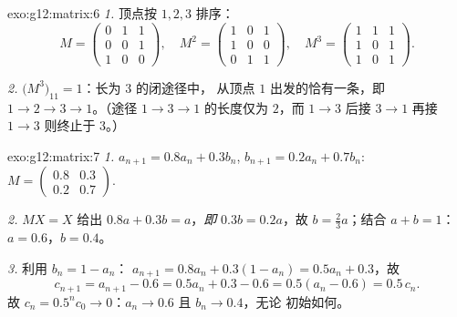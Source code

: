 \begin{solution}{exo:g12:matrix:6}
\emph{1.} 顶点按 $1, 2, 3$ 排序：
\[
M = \begin{pmatrix} 0&1&1\\ 0&0&1\\ 1&0&0\end{pmatrix}, \quad
M^2 = \begin{pmatrix} 1&0&1\\ 1&0&0\\ 0&1&1\end{pmatrix}, \quad
M^3 = \begin{pmatrix} 1&1&1\\ 1&0&1\\ 1&0&1 \end{pmatrix}.
\]

\emph{2.} $\bigl(M^3\bigr)_{11} = 1$：长为 $3$ 的闭途径中，
从顶点 $1$ 出发的恰有一条，即 $1 \to 2 \to 3 \to 1$。（途径
$1 \to 3 \to 1$ 的长度仅为 $2$，而 $1 \to 3$ 后接 $3\to1$ 再接
$1\to3$ 则终止于 $3$。）
\end{solution}

\begin{solution}{exo:g12:matrix:7}
\emph{1.} $a_{n+1} = 0.8a_n + 0.3b_n$, $b_{n+1} = 0.2a_n + 0.7b_n$:
$M = \begin{pmatrix} 0.8 & 0.3\\ 0.2 & 0.7\end{pmatrix}$.

\emph{2.} $MX = X$ 给出 $0.8a + 0.3b = a$，\emph{即} $0.3b = 0.2a$，故
$b = \frac23 a$；结合 $a + b = 1$：$a = 0.6$，$b = 0.4$。

\emph{3.} 利用 $b_n = 1 - a_n$：
$a_{n+1} = 0.8a_n + 0.3(1 - a_n) = 0.5a_n + 0.3$，故
\[
c_{n+1} = a_{n+1} - 0.6 = 0.5a_n + 0.3 - 0.6 = 0.5(a_n - 0.6) = 0.5\,c_n .
\]
故 $c_n = 0.5^n c_0 \to 0$：$a_n \to 0.6$ 且 $b_n \to 0.4$，无论
初始如何。
\end{solution}

